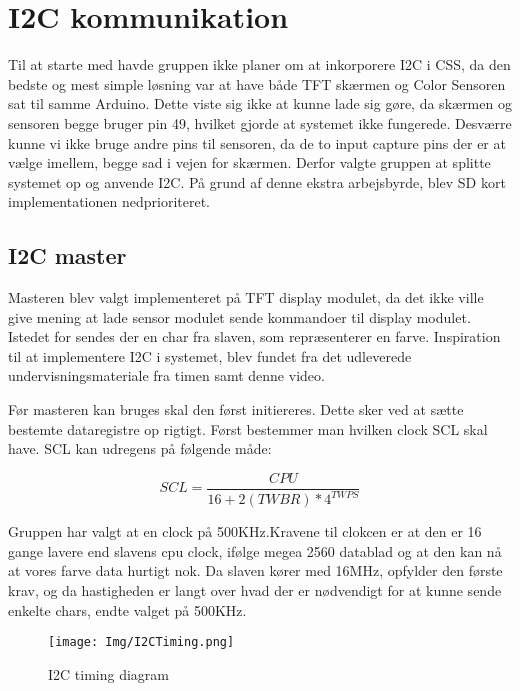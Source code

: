 \graphicspath{{Chapters/Test/}}


\section{I2C kommunikation}
Til at starte med havde gruppen ikke planer om at inkorporere I2C i CSS, da den bedste og mest simple løsning var at have både TFT skærmen og Color Sensoren sat til samme Arduino. Dette viste sig ikke at kunne lade sig gøre, da skærmen og sensoren begge bruger pin 49, hvilket gjorde at systemet ikke fungerede. Desværre kunne vi ikke bruge andre pins til sensoren, da de to input capture pins der er at vælge imellem, begge sad i vejen for skærmen. Derfor valgte gruppen at splitte systemet op og anvende I2C. På grund af denne ekstra arbejsbyrde, blev SD kort implementationen nedprioriteret.

\subsection{I2C master}
Masteren blev valgt implementeret på TFT display modulet, da det ikke ville give mening at lade sensor modulet sende kommandoer til display modulet. Istedet for sendes der en char fra slaven, som repræsenterer en farve. Inspiration til at implementere I2C i systemet, blev fundet fra det udleverede undervisningsmateriale fra timen samt denne video\cite{mic:I2CVideo}.

Før masteren kan bruges skal den først initiereres. Dette sker ved at sætte bestemte dataregistre op rigtigt. Først bestemmer man hvilken clock SCL skal have. SCL kan udregens på følgende måde:

\begin{equation}
SCL= \frac{CPU}{16+2(TWBR)*4^{TWPS}} 
\end{equation}

Gruppen har valgt at en clock på 500KHz.Kravene til clokcen er at den er 16 gange lavere end slavens cpu clock, ifølge megea 2560 datablad og at den kan nå at vores farve data hurtigt nok. Da slaven kører med 16MHz, opfylder den første krav, og da hastigheden er langt over hvad der er nødvendigt for at kunne sende enkelte chars, endte valget på 500KHz. 

\begin{figure}[H]
	\centering
	\texttt{[image: Img/I2CTiming.png]}
	\caption{I2C timing diagram}
	\label{fig:I2CTIming}
\end{figure}

